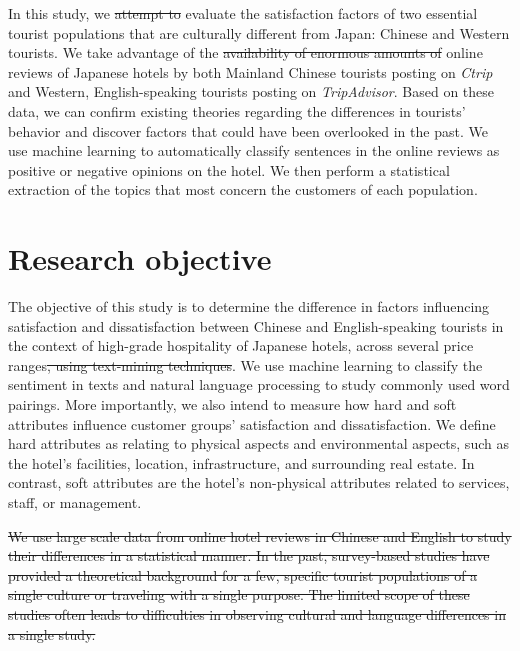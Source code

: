 \documentclass[smallextended,natbib]{svjour3}       %
\providecommand{\DIFadd}[1]{{\protect\color{blue}\uwave{#1}}} %
\providecommand{\DIFdel}[1]{{\protect\color{red}\sout{#1}}}                      %
\providecommand{\DIFaddbegin}{} %
\providecommand{\DIFaddend}{} %
\providecommand{\DIFdelbegin}{} %
\providecommand{\DIFdelend}{} %
\newcommand{\DIFscaledelfig}{0.5}
\newlength{\DIFdelgraphicswidth} %
\newlength{\DIFdelgraphicsheight} %
\newcommand{\DIFaddincludegraphics}[2][]{{\color{blue}\fbox{\DIFOincludegraphics[#1]{#2}}}} %
\newcommand{\DIFdelincludegraphics}[2][]{%
\sbox{\DIFdelgraphicsbox}{\DIFOincludegraphics[#1]{#2}}%
\settoboxwidth{\DIFdelgraphicswidth}{\DIFdelgraphicsbox} %
\settoboxtotalheight{\DIFdelgraphicsheight}{\DIFdelgraphicsbox} %
\scalebox{\DIFscaledelfig}{%
\parbox[b]{\DIFdelgraphicswidth}{\usebox{\DIFdelgraphicsbox}\\[-\baselineskip] \rule{\DIFdelgraphicswidth}{0em}}\llap{\resizebox{\DIFdelgraphicswidth}{\DIFdelgraphicsheight}{%
\setlength{\unitlength}{\DIFdelgraphicswidth}%
\begin{picture}(1,1)%
\thicklines\linethickness{2pt} %
{\color[rgb]{1,0,0}\put(0,0){\framebox(1,1){}}}%
{\color[rgb]{1,0,0}\put(0,0){\line( 1,1){1}}}%
{\color[rgb]{1,0,0}\put(0,1){\line(1,-1){1}}}%
\end{picture}%
}\hspace*{3pt}}} %
} %
\DeclareRobustCommand{\DIFaddbegin}{\DIFOaddbegin \let\includegraphics\DIFaddincludegraphics} %
\DeclareRobustCommand{\DIFaddend}{\DIFOaddend \let\includegraphics\DIFOincludegraphics} %
\DeclareRobustCommand{\DIFdelbegin}{\DIFOdelbegin \let\includegraphics\DIFdelincludegraphics} %
\DeclareRobustCommand{\DIFdelend}{\DIFOaddend \let\includegraphics\DIFOincludegraphics} %
\begin{document}
  In this study, we \DIFdelbegin \DIFdel{attempt to }\DIFdelend evaluate the satisfaction factors of two essential tourist populations that are culturally different from Japan: Chinese and Western tourists. We take advantage of the \DIFdelbegin \DIFdel{availability of enormous amounts of }\DIFdelend \DIFaddbegin \DIFadd{wide availability of }\DIFaddend online reviews of Japanese hotels by both Mainland Chinese tourists posting on \textit{Ctrip} and Western, English-speaking tourists posting on \textit{TripAdvisor}. Based on these data, we can confirm existing theories regarding the differences in tourists’ behavior and discover factors that could have been overlooked in the past. We use machine learning to automatically classify sentences in the online reviews as positive or negative opinions on the hotel. We then perform a statistical extraction of the topics that most concern the customers of each population.

\section{Research objective}\label{research_objective}

  The objective of this study is to determine the difference in factors influencing satisfaction and dissatisfaction between Chinese and English-speaking tourists in the context of high-grade hospitality of Japanese hotels, across several price ranges\DIFdelbegin \DIFdel{, using text-mining techniques}\DIFdelend . We use machine learning to classify the sentiment in texts and natural language processing to study commonly used word pairings. More importantly, we also intend to measure how hard and soft attributes influence customer groups' satisfaction and dissatisfaction. We define hard attributes as relating to physical aspects and environmental aspects, such as the hotel's facilities, location, infrastructure, and surrounding real estate. In contrast, soft attributes are the hotel's non-physical attributes related to services, staff, or management.

\DIFdelbegin \DIFdel{We use large scale data from online hotel reviews in Chinese and English to study their differences in a statistical manner. In the past, survey-based studies have provided a theoretical background for a few, specific tourist populations of a single culture or traveling with a single purpose. The limited scope of these studies often leads to difficulties in observing cultural and language differences in a single study.
}%
\end{document}
